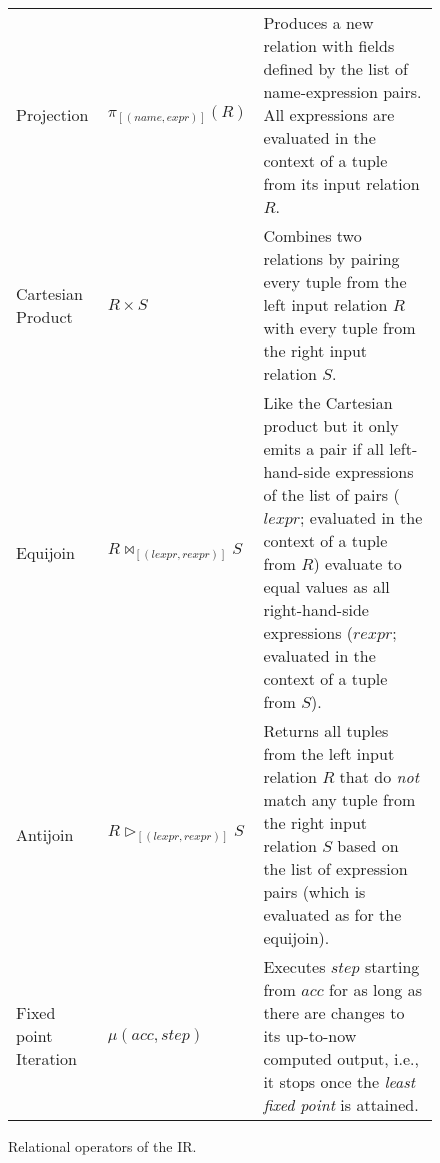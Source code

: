 \begin{figure}[htpb]
\begin{tabular}{@{}p{}p{}p{}@{}}
        Projection         & \(\pi_{[(\mathit{name},\mathit{expr})]}(R)\)                & Produces a new relation with fields defined by the list of name-expression pairs. All expressions are evaluated in the context of a tuple from its input relation \(R\).                                                                                                                                          \\
        Cartesian Product  & \(R \times S\)                                              & Combines two relations by pairing every tuple from the left input relation \(R\) with every tuple from the right input relation \(S\).                                                                                                                                                                            \\
        Equijoin           & \(R \bowtie_{[(\mathit{lexpr}, \mathit{rexpr})]} S\)        & Like the Cartesian product but it only emits a pair if all left-hand-side expressions of the list of pairs (\(\mathit{lexpr}\); evaluated in the context of a tuple from \(R\)) evaluate to equal values as all right-hand-side expressions (\(\mathit{rexpr}\); evaluated in the context of a tuple from \(S\)). \\
        Antijoin           & \(R \triangleright_{[(\mathit{lexpr}, \mathit{rexpr})]} S\) & Returns all tuples from the left input relation \(R\) that do \emph{not} match any tuple from the right input relation \(S\) based on the list of expression pairs (which is evaluated as for the equijoin).                                                                                                      \\
        Fixed point Iteration & \(\mu(\mathit{acc}, \mathit{step})\)                        & Executes \(\mathit{step}\) starting from \(\mathit{acc}\) for as long as there are changes to its up-to-now computed output, i.e., it stops once the \emph{least fixed point} is attained.                                                                                                                           \\
        \bottomrule
    \end{tabular}
    \caption{Relational operators of the \ac{IR}.}\label{tab:ir-operators}
\end{figure}

